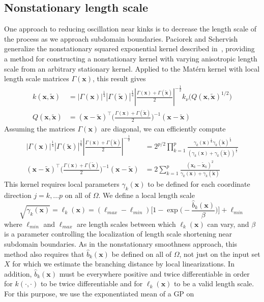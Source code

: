 \documentclass{article}
\newcommand{\abs}[1]{\left|#1\right|}
\renewcommand{\vec}[1]{\mathbf{#1}}
\begin{document}
\subsection{Nonstationary length scale}
One approach to reducing oscillation near kinks is to decrease the length scale of the process as we approach subdomain boundaries. Paciorek and Schervish~\cite{paciorek2004nonstationary} generalize the nonstationary squared exponential kernel described in~\cite{gibbs1998bayesian}, providing a method for constructing a nonstationary kernel with varying anisotropic length scale from an arbitrary stationary kernel. Applied to the Mat\'ern kernel with local length scale matrices $\Gamma(\vec{x})$, this result gives
\begin{align*}
  k(\vec{x}, \tilde{\vec{x}})
  & = |\Gamma(\vec{x})|^{\frac{1}{4}} |\Gamma(\tilde{\vec{x}})|^{\frac{1}{4}} \abs{\frac{\Gamma(\vec{x}) + \Gamma(\tilde{\vec{x}})}{2}}^{-\frac{1}{2}}
  k_\nu \Big(Q(\vec{x}, \tilde{\vec{x}})^{1/2}\Big) \\
  Q(\vec{x}, \tilde{\vec{x}}) & = (\vec{x} - \tilde{\vec{x}})^\top \Big(\frac{\Gamma(\vec{x}) + \Gamma(\tilde{\vec{x}})}{2}\Big)^{-1} (\vec{x} - \tilde{\vec{x}})
\end{align*}
Assuming the matrices $\Gamma(\vec{x})$ are diagonal, we can efficiently compute
\begin{align*}
   |\Gamma(\vec{x})|^{\frac{1}{4}} |\Gamma(\tilde{\vec{x}})|^{\frac{1}{4}} \abs{\frac{\Gamma(\vec{x}) + \Gamma(\tilde{\vec{x}})}{2}}^{-\frac{1}{2}}
   & = 2^{p/2} \prod_{k=1}^p \frac{\gamma_k(\vec{x})^\frac{1}{4} \gamma_k(\tilde{\vec{x}})^\frac{1}{4}}{(\gamma_k(\vec{x}) + \gamma_k(\tilde{\vec{x}}))^\frac{1}{2}} \\
   (\vec{x} - \tilde{\vec{x}})^\top \Big(\frac{\Gamma(\vec{x}) + \Gamma(\tilde{\vec{x}})}{2}\Big)^{-1} (\vec{x} - \tilde{\vec{x}})
   & = 2 \sum_{k=1}^p \frac{(\vec{x}_k - \tilde{\vec{x}}_k)^2}{\gamma_k(\vec{x}) + \gamma_k(\tilde{\vec{x}})}
\end{align*}
This kernel requires local parameters
$\gamma_k(\vec{x})$ to be defined for each coordinate direction $j=k,...p$ on all of $\Omega$. We define a local length scale
$$ \sqrt{\gamma_k(\vec{x})} = \ell_k(\vec{x}) = (\ell_{max} - \ell_{min}) \bigg[1 - \exp\bigg(-\frac{\hat{b}_k(\vec{x})}{\beta}\bigg)\bigg] + \ell_{min} $$
where $\ell_{min}$ and $\ell_{max}$ are length scales between which $\ell_k(\vec{x})$ can vary, and $\beta$ is a parameter controlling the localization of length scale shortening near subdomain boundaries. As in the nonstationary smoothness approach, this method also requires that $\hat{b}_k(\vec{x})$ be defined on all of $\Omega$, not just on the input set $X$ for which we estimate the branching distance by local linearizations. In addition, $\hat{b}_k(\vec{x})$ must be everywhere positive and twice differentiable in order for $k(\cdot, \cdot)$ to be twice differentiable and for $\ell_k(\vec{x})$ to be a valid length scale. For this purpose, we use the exponentiated mean of a GP on
\end{document}
